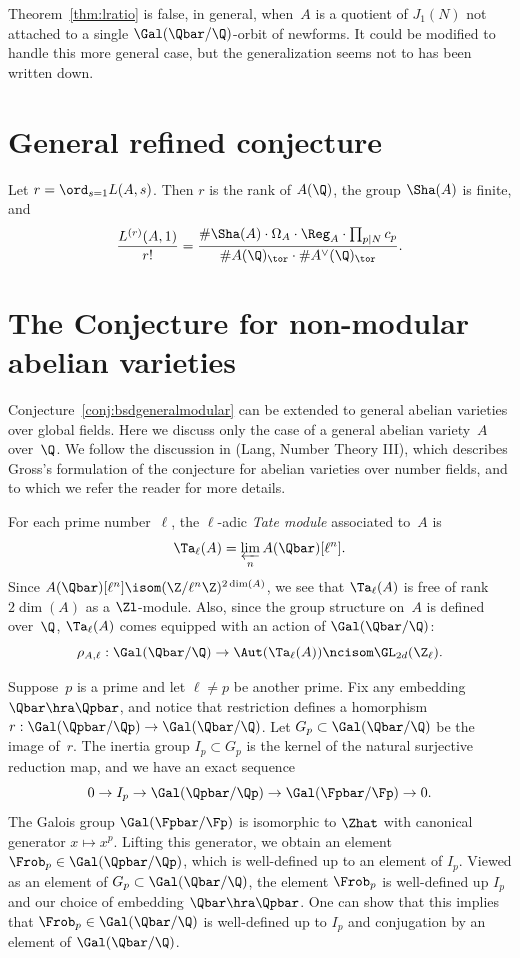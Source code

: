 \documentclass{report}
\begin{document}
\begin{remark}
  Theorem~\ref{thm:lratio} is false, in general, when~$A$ is a
  quotient of $J_1(N)$ not attached to a single $\Gal(\Qbar/\Q)$-orbit
  of newforms.  It could be modified to handle this more general case,
  but the generalization seems not to has been written down.
\end{remark}




\section{General refined conjecture}

\begin{conjecture}\label{conj:bsdgeneralmodular}
Let $r=\ord_{s=1} L(A,s)$.  Then $r$ is the rank of $A(\Q)$, the group
$\Sha(A)$ is finite, and
$$
  \frac{L^{(r)}(A,1)}{r!}  =
  \frac{\#\Sha(A)\cdot \Omega_A \cdot \Reg_A \cdot \prod_{p\mid N} c_p}
     {\#A(\Q)_{\tor}\cdot \#A^{\vee}(\Q)_{\tor}}.
$$
\end{conjecture}

\section{The Conjecture for non-modular abelian varieties}
\label{sec;bsdconjnonmod}
Conjecture~\ref{conj:bsdgeneralmodular} can be extended to general
abelian varieties over global fields.  Here we discuss only the case
of a general abelian variety~$A$ over~$\Q$.  We follow the discussion
in \cite[95-94]{lang:nt3} (Lang, Number Theory III), which describes Gross's formulation of the conjecture for
abelian varieties over number fields, and to which we refer the reader
for more details.

For each prime number~$\ell$, the
$\ell$-adic {\em Tate module} associated to~$A$ is
$$
\Ta_{\ell}(A) =\varprojlim_{n} A(\Qbar)[\ell^n].
$$
Since $A(\Qbar)[\ell^n]\isom (\Z/\ell^n\Z)^{2\dim(A)}$, we
see that
$\Ta_{\ell}(A)$ is free of rank $2\dim(A)$ as a $\Zl$-module.
Also, since the group structure on~$A$ is defined over~$\Q$,
$\Ta_{\ell}(A)$ comes equipped with an action
of $\Gal(\Qbar/\Q)$:
$$
  \rho_{A,\ell} : \Gal(\Qbar/\Q) \to \Aut(\Ta_{\ell}(A))\ncisom \GL_{2d}(\Z_\ell).
$$

Suppose~$p$ is a prime and let $\ell\neq p$ be another prime.  Fix any
embedding $\Qbar\hra \Qpbar$, and notice that restriction defines a
homorphism $r:\Gal(\Qpbar/\Qp)\to \Gal(\Qbar/\Q)$.  Let $G_p\subset
\Gal(\Qbar/\Q)$ be the image of~$r$.  The inertia group
$I_p\subset G_p$ is the kernel of the natural surjective reduction
map, and we have an exact sequence
$$
0\to I_p \to \Gal(\Qpbar/\Qp) \to \Gal(\Fpbar/\Fp)\to 0.
$$
The Galois group $\Gal(\Fpbar/\Fp)$ is isomorphic to $\Zhat$ with
canonical generator $x\mapsto x^p$.  Lifting this generator,
we obtain an element $\Frob_p\in\Gal(\Qpbar/\Qp)$, which
is well-defined up to an element of $I_p$.  Viewed as
an element of $G_p\subset \Gal(\Qbar/\Q)$, the element
$\Frob_p$ is well-defined up $I_p$ and our choice of embedding
$\Qbar\hra \Qpbar$.  One can show that this implies that
$\Frob_p\in\Gal(\Qbar/\Q)$ is well-defined up to $I_p$ and
conjugation by an element of $\Gal(\Qbar/\Q)$.
\end{document}
